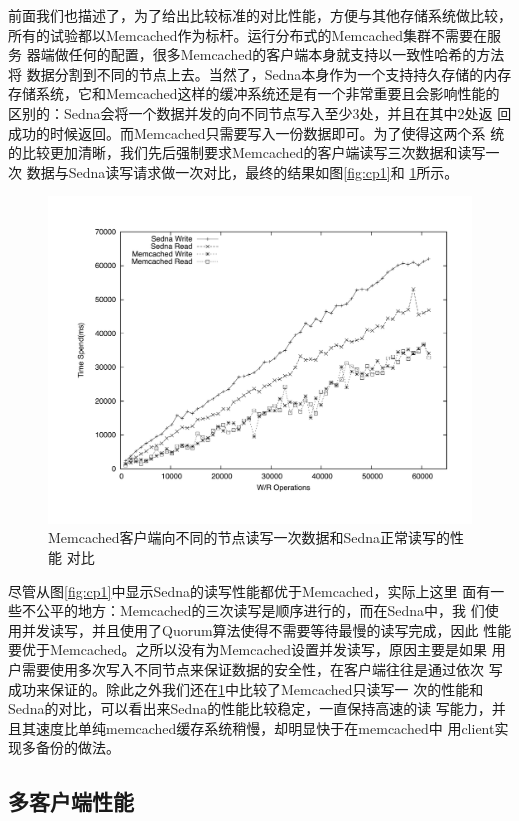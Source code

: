 前面我们也描述了，为了给出比较标准的对比性能，方便与其他存储系统做比较，
所有的试验都以Memcached作为标杆。运行分布式的Memcached集群不需要在服务
器端做任何的配置，很多Memcached的客户端本身就支持以一致性哈希的方法将
数据分割到不同的节点上去。当然了，Sedna本身作为一个支持持久存储的内存
存储系统，它和Memcached这样的缓冲系统还是有一个非常重要且会影响性能的
区别的：Sedna会将一个数据并发的向不同节点写入至少3处，并且在其中2处返
回成功的时候返回。而Memcached只需要写入一份数据即可。为了使得这两个系
统的比较更加清晰，我们先后强制要求Memcached的客户端读写三次数据和读写一次
数据与Sedna读写请求做一次对比，最终的结果如图\ref{fig:cp1}和
\ref{fig:cp2}所示。

\begin{figure}[h!]
  \centering
  \includegraphics[width=5in]{../figures/compare_one_client_memcached_one.pdf}
  \caption{Memcached客户端向不同的节点读写一次数据和Sedna正常读写的性能
    对比}
\label{fig:cp2}
\end{figure}

尽管从图\ref{fig:cp1}中显示Sedna的读写性能都优于Memcached，实际上这里
面有一些不公平的地方：Memcached的三次读写是顺序进行的，而在Sedna中，我
们使用并发读写，并且使用了Quorum算法使得不需要等待最慢的读写完成，因此
性能要优于Memcached。之所以没有为Memcached设置并发读写，原因主要是如果
用户需要使用多次写入不同节点来保证数据的安全性，在客户端往往是通过依次
写成功来保证的。除此之外我们还在\ref{fig:cp2}中比较了Memcached只读写一
次的性能和Sedna的对比，可以看出来Sedna的性能比较稳定，一直保持高速的读
写能力，并且其速度比单纯memcached缓存系统稍慢，却明显快于在memcached中
用client实现多备份的做法。

\subsection{多客户端性能}

